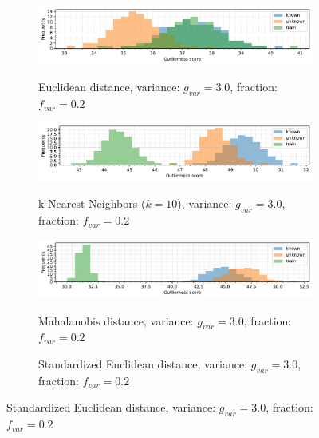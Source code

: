 \begin{figure}[t]
    \centering
    \begin{subfigure}[b]{\textwidth}
        \centering
        \caption{\small Euclidean distance, variance: $g_{var} = 3.0$, fraction: $f_{var} = 0.2$}
        \includegraphics[width=\textwidth]{images/variances/hists/hist-variances-n_varied_0.20-variance_3.00-distance_16-outliers_varied_False-model_ED-seed_0.pdf}
        \label{fig:hists-variances-ed}
    \end{subfigure}
    \begin{subfigure}[b]{\textwidth}
        \centering
        \caption{\small k-Nearest Neighbors ($k=10$), variance: $g_{var} = 3.0$, fraction: $f_{var} = 0.2$}
        \includegraphics[width=\textwidth]{images/variances/hists/hist-variances-n_varied_0.20-variance_3.00-distance_16-outliers_varied_False-model_kNN-10-seed_0.pdf}
        \label{fig:hists-variances-knn}
    \end{subfigure}
    \begin{subfigure}[b]{\textwidth}
        \centering
        \caption{\small Mahalanobis distance, variance: $g_{var} = 3.0$, fraction: $f_{var} = 0.2$}
        \includegraphics[width=\textwidth]{images/variances/hists/hist-variances-n_varied_0.20-variance_3.00-distance_16-outliers_varied_False-model_MD-seed_0.pdf}
        \label{fig:hists-variances-md}
    \end{subfigure}
    \begin{subfigure}[b]{\textwidth}
        \centering
        \caption{\small Standardized Euclidean distance, variance: $g_{var} = 3.0$, fraction: $f_{var} = 0.2$}

\end{subfigure}
\end{figure}
